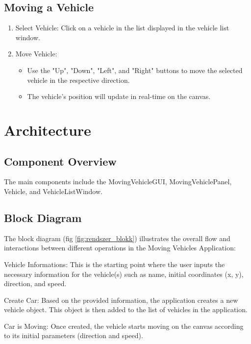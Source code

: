 \documentclass{article}
\begin{document}
\subsection{Moving a Vehicle}

\begin{enumerate}
    \item Select Vehicle: Click on a vehicle in the list displayed in the vehicle list window.
    \item Move Vehicle:
    \begin{itemize}
        \item Use the "Up", "Down", "Left", and "Right" buttons to move the selected vehicle in the respective direction.
        \item The vehicle's position will update in real-time on the canvas.
    \end{itemize}


\end{enumerate}
\newpage
\section{Architecture}

\subsection{Component Overview}

The main components include the MovingVehicleGUI, MovingVehiclePanel, Vehicle, and VehicleListWindow.

\subsection{Block Diagram}

The block diagram (fig \ref{fig:rendszer_blokk}) illustrates the overall flow and interactions between different operations in the Moving Vehicles Application:

Vehicle Informations: This is the starting point where the user inputs the necessary information for the vehicle(s) such as name, initial coordinates (x, y), direction, and speed.

Create Car: Based on the provided information, the application creates a new vehicle object. This object is then added to the list of vehicles in the application.

Car is Moving: Once created, the vehicle starts moving on the canvas according to its initial parameters (direction and speed). 
\end{document}
